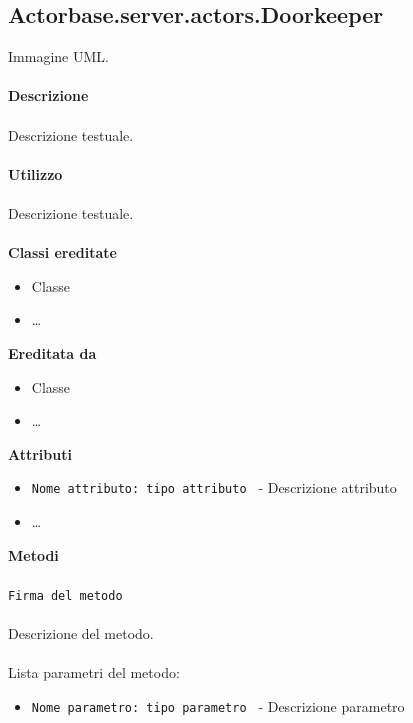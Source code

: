 \documentclass[a4paper]{article}
\begin{document}
	\subsection{Actorbase.server.actors.Doorkeeper}
		Immagine UML.
		\\ \\
		\textbf{Descrizione}
			\\ \\
			Descrizione testuale.
			\\ \\
		\textbf{Utilizzo}
			\\ \\
			Descrizione testuale.
			\\ \\
		\textbf{Classi ereditate}
			\begin{itemize}
				\item Classe
				\item \dots
			\end{itemize}
		\textbf{Ereditata da}
			\begin{itemize}
				\item Classe
				\item \dots
			\end{itemize}
		\textbf{Attributi}
			\begin{itemize}
				\item \texttt{Nome attributo: tipo attributo } - Descrizione attributo
				\item \dots
			\end{itemize}
		\textbf{Metodi}
			\\ \\
			\texttt{Firma del metodo}
			\\ \\
			Descrizione del metodo.
			\\ \\
			Lista parametri del metodo:
			\begin{itemize}
				\item \texttt{Nome parametro: tipo parametro } - Descrizione parametro
			\end{itemize}
			
\end{document}
